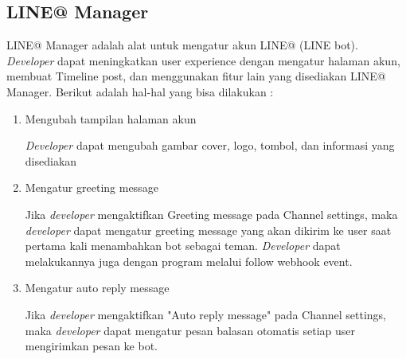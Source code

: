 \subsection{LINE@ Manager}
LINE@ Manager adalah alat untuk mengatur akun LINE@ (LINE bot). \textit{Developer} dapat meningkatkan user experience dengan mengatur halaman akun, membuat Timeline post, dan menggunakan fitur lain yang disediakan LINE@ Manager. Berikut adalah hal-hal yang bisa dilakukan :
\begin{enumerate}
\item Mengubah tampilan halaman akun

\textit{Developer} dapat mengubah gambar cover, logo, tombol, dan informasi yang disediakan

\item Mengatur greeting message

Jika \textit{developer} mengaktifkan Greeting message pada Channel settings, maka \textit{developer} dapat mengatur greeting message yang akan dikirim ke user saat pertama kali menambahkan bot sebagai teman. \textit{Developer} dapat melakukannya juga dengan program melalui follow webhook event.

\item Mengatur auto reply message

Jika \textit{developer} mengaktifkan "Auto reply message" pada Channel settings, maka \textit{developer} dapat mengatur pesan balasan otomatis setiap user mengirimkan pesan ke bot.
\end{enumerate}